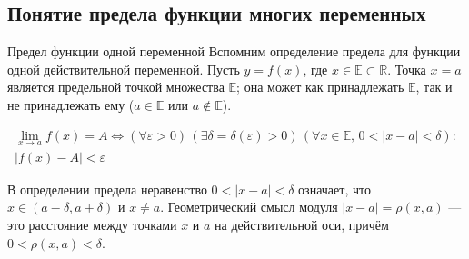\subsection{Понятие предела функции многих переменных}
\begin{tbox}{Предел функции одной переменной}
	Вспомним определение предела для функции одной действительной переменной. Пусть \( y = f(x) \), где \( x \in \mathbb{E} \subset \mathbb{R} \). Точка \( x = a \) является предельной точкой множества \( \mathbb{E} \); она может как принадлежать \( \mathbb{E} \), так и не принадлежать ему (\( a \in \mathbb{E} \) или \( a \notin \mathbb{E} \)).

	\begin{multline} \label{eq:1.3.1}
		\lim_{x \to a} f(x) = A \Leftrightarrow
		(\forall \varepsilon > 0) \, (\exists \delta = \delta(\varepsilon) > 0) \,
		(\forall x \in \mathbb{E}, \, 0 < |x - a| < \delta) : \\
		|f(x) - A| < \varepsilon
	\end{multline}

	В определении предела неравенство \( 0 < |x - a| < \delta \) означает, что \( x \in (a - \delta, a + \delta) \) и \( x \neq a \). Геометрический смысл модуля \( |x - a| = \rho(x, a) \) — это расстояние между точками \( x \) и \( a \) на действительной оси, причём \( 0 < \rho(x, a) < \delta \).
\end{tbox}

